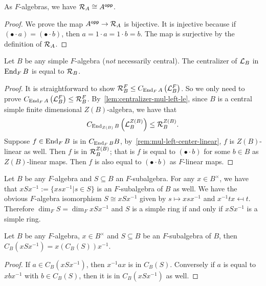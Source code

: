  \begin{lemma}\label{lem:mul-right-iso-opp}
   As $F$-algebras, we have $\mathcal{R}_{A}\cong A^{\mathsf{opp}}$. \leanok
 \end{lemma}
 \begin{proof}
   We prove the map $A^{\mathsf{opp}} \to \mathcal{R}_{A}$ is bijective. It is injective
   because if $\left(\bullet \cdot a\right) = \left(\bullet\cdot b\right)$, then
   $a = 1 \cdot a = 1 \cdot b = b$. The map is surjective by the definition of
   $\mathcal{R}_{A}$.
 \end{proof}
 \begin{lemma}\label{lem:centralizer-mul-left-eq-mul-right}
   Let $B$ be any simple $F$-algebra ({\em not\/} necessarily central). The
   centralizer of $\mathcal{L}_{B}$ in $\operatorname{End}_{F}B$ is equal to $\mathcal{R}_{B}$.
   \leanok
 \end{lemma}
 \begin{proof}
   It is straightforward to show
   $\mathcal{R}_{B}^{F}\le C_{\operatorname{End}_{F}A}\left(\mathcal{L}_{B}^{F}\right)$. So we only need to
   prove $C_{\operatorname{End}_{F}A}\left(\mathcal{L}_{B}^{F}\right)\le \mathcal{R}_{B}^{F}$.
   By~\cref{lem:centralizer-mul-left-le}, since $B$ is a central simple finite
   dimensional $Z(B)$-algebra, we have that
   \[
     C_{\operatorname{End}_{Z(B)}B}\left(\mathcal{L}_{B}^{Z(B)}\right) \le \mathcal{R}_{B}^{Z(B)}.
   \]
   Suppose $f\in\operatorname{End}_{F}B$ is in $C_{\operatorname{End}_{F}B}B$, by~\cref{rem:mul-left-center-linear}, $f$ is $Z(B)$-linear as well. Then $f$ is
   in $\mathcal{R}_{B}^{Z(B)}$; that is $f$ is equal to $\left(\bullet\cdot b\right)$
   for some $b \in B$ as $Z(B)$-linear maps. Then $f$ is also equal to
   $\left(\bullet\cdot b\right)$ as $F$-linear maps.
 \end{proof}

 \begin{construction}
   Let $B$ be any $F$-algebra and $S\subseteq B$ an $F$-subalgebra. For any
   $x\in B^{\times}$, we have that $x S x^{-1}:=\{xsx^{-1}|s\in S\}$ is an
   $F$-subalgebra of $B$ as well. We have the obvious $F$-algebra isomorphism
   $S \cong xSx^{-1}$ given by $s\mapsto xsx^{-1}$ and $x^{-1}tx\mapsfrom t$.
   Therefore $\dim_{F}S=\dim_{F}xSx^{-1}$ and $S$ is a simple ring if and only
   if $xSx^{-1}$ is a simple ring.
   \leanok
 \end{construction}

 \begin{lemma}
   \label{lem:centralizer-conj}
   Let $B$ be any $F$-algebra, $x \in B^{\times}$ and $S\subseteq B$ be an
   $F$-subalgebra of $B$, then $C_{B}(xSx^{-1})=x\left(C_{B}(S)\right)x^{-1}$.
   \leanok
 \end{lemma}
 \begin{proof}
   If $a \in C_{B}\left(xSx^{-1}\right)$, then $x^{-1}ax$ is in $C_{B}(S)$.
   Conversely if $a$ is equal to $xbx^{-1}$ with $b\in C_{B}(S)$, then it is in
   $C_{B}\left(xSx^{-1}\right)$ as well.
 \end{proof}


